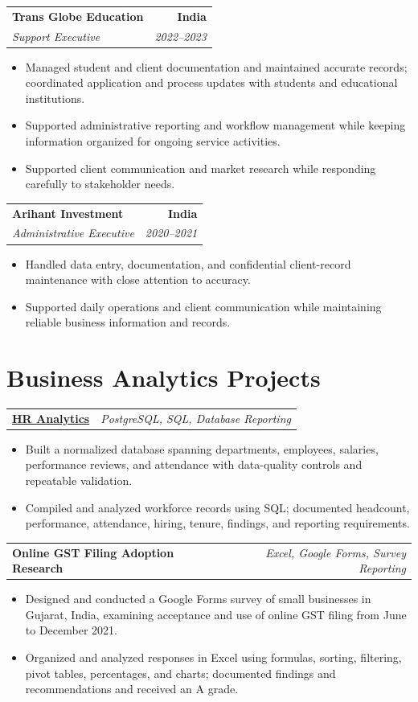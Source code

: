 \documentclass[letterpaper,10pt]{article}
\makeatletter
\newcommand{\role}[4]{%
  \begin{tabularx}{\textwidth}{@{}Xr@{}}
    \textbf{#1} & \textbf{#2} \\
    \textit{#3} & \textit{#4}
  \end{tabularx}\vspace{-1pt}
}
\newcommand{\project}[2]{%
  \begin{tabularx}{\textwidth}{@{}Xr@{}}
    \textbf{#1} & \textit{#2}
  \end{tabularx}\vspace{-1pt}
}
\makeatother
\begin{document}
\role{Trans Globe Education}{India}{Support Executive}{2022--2023}
\begin{itemize}
  \item Managed student and client documentation and maintained accurate records; coordinated application and process updates with students and educational institutions.
  \item Supported administrative reporting and workflow management while keeping information organized for ongoing service activities.
  \item Supported client communication and market research while responding carefully to stakeholder needs.
\end{itemize}
\vspace{1pt}

\role{Arihant Investment}{India}{Administrative Executive}{2020--2021}
\begin{itemize}
  \item Handled data entry, documentation, and confidential client-record maintenance with close attention to accuracy.
  \item Supported daily operations and client communication while maintaining reliable business information and records.
\end{itemize}

\section{Business Analytics Projects}
\project{\href{https://github.com/jainalimehta/HR-Analytics}{HR Analytics}}{PostgreSQL, SQL, Database Reporting}
\begin{itemize}
  \item Built a normalized database spanning departments, employees, salaries, performance reviews, and attendance with data-quality controls and repeatable validation.
  \item Compiled and analyzed workforce records using SQL; documented headcount, performance, attendance, hiring, tenure, findings, and reporting requirements.
\end{itemize}
\vspace{1pt}

\project{Online GST Filing Adoption Research}{Excel, Google Forms, Survey Reporting}
\begin{itemize}
  \item Designed and conducted a Google Forms survey of small businesses in Gujarat, India, examining acceptance and use of online GST filing from June to December 2021.
  \item Organized and analyzed responses in Excel using formulas, sorting, filtering, pivot tables, percentages, and charts; documented findings and recommendations and received an A grade.
\end{itemize}
\end{document}
